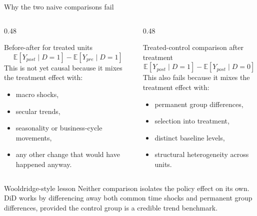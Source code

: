 \documentclass[10pt]{beamer}
\newcommand{\E}{\mathbb{E}}
\begin{document}
\begin{frame}{Why the two naive comparisons fail}
\label{slide:did_naive}
\small
\begin{columns}[T]
\begin{column}{0.48\textwidth}
\begin{block}{Before-after for treated units}
\[
\E[Y_{post}\mid D=1]-\E[Y_{pre}\mid D=1]
\]
This is not yet causal because it mixes the treatment effect with:
\begin{itemize}
  \item macro shocks,
  \item secular trends,
  \item seasonality or business-cycle movements,
  \item any other change that would have happened anyway.
\end{itemize}
\end{block}
\end{column}
\begin{column}{0.48\textwidth}
\begin{block}{Treated-control comparison after treatment}
\[
\E[Y_{post}\mid D=1]-\E[Y_{post}\mid D=0]
\]
This also fails because it mixes the treatment effect with:
\begin{itemize}
  \item permanent group differences,
  \item selection into treatment,
  \item distinct baseline levels,
  \item structural heterogeneity across units.
\end{itemize}
\end{block}
\end{column}
\end{columns}

\begin{alertblock}{Wooldridge-style lesson}
Neither comparison isolates the policy effect on its own. DiD works by differencing away both common time shocks and permanent group differences, provided the control group is a credible trend benchmark.
\end{alertblock}
\end{frame}
\end{document}
